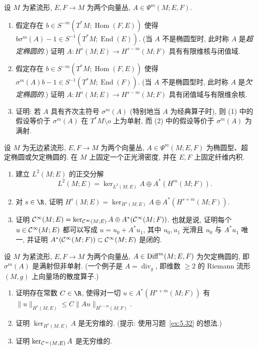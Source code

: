 \begin{exer}[超定与欠定椭圆算子: I]\label{ex:5.35}
设 $M$ 为紧流形, $E, F \to M$ 为两个向量丛, $A \in \Psi^m(M; E, F)$.
\begin{enumerate}
    \item 假定存在 $b \in S^{-m}(T^* M; \operatorname{Hom}(F, E))$ 使得 $b \sigma^m(A) - 1 \in S^{-1}(T^* M; \operatorname{End}(E))$. (当 $A$ 不是椭圆型时, 此时称 $A$ 是\emph{超定椭圆的}.) 证明 $A \colon H^s(M; E) \to H^{s-m}(M; F)$ 具有有限维核与闭值域.
    \item 假定存在 $b \in S^{-m}(T^* M; \operatorname{Hom}(F, E))$ 使得 $\sigma^m(A) b - 1 \in S^{-1}(T^* M; \operatorname{End}(F))$. (当 $A$ 不是椭圆型时, 此时称 $A$ 是\emph{欠定椭圆的}.) 证明 $A \colon H^s(M; E) \to H^{s-m}(M; F)$ 具有闭值域与有限维余核.
    \item 证明: 若 $A$ 具有齐次主符号 $\sigma^m(A)$ (特别地当 $A$ 为经典算子时), 则 (1) 中的假设等价于 $\sigma^m(A)$ 在 $T^* M \setminus o$ 上为单射, 而 (2) 中的假设等价于 $\sigma^m(A)$ 为满射.
\end{enumerate}
\end{exer}

\begin{exer}[超定与欠定椭圆算子: II]\label{ex:5.36}
设 $M$ 为无边紧流形, $E, F \to M$ 为两个向量丛, $A \in \Psi^m(M; E, F)$ 为椭圆型、超定椭圆或欠定椭圆的. 在 $M$ 上固定一个正光滑密度, 并在 $E, F$ 上固定纤维内积.
\begin{enumerate}
    \item 建立 $L^2(M; E)$ 的正交分解
    \begin{equation}\label{eq:5.233}
        L^2(M; E) = \ker_{L^2(M; E)} A \oplus A^*(H^m(M; F)).
    \end{equation}
    \item 对 $s \in \R$, 证明 $H^s(M; E) = \ker_{H^s(M; E)} A \oplus A^*(H^{s+m}(M; F))$.
    \item 证明 $\mathcal{C}^\infty(M; E) = \ker_{\mathcal{C}^\infty(M; E)} A \oplus A^*(\mathcal{C}^\infty(M; F))$. 也就是说, 证明每个 $u \in \mathcal{C}^\infty(M; E)$ 都可以写成 $u = u_0 + A^* u_1$, 其中 $u_0, u_1$ 光滑且 $u_0$ 与 $A^* u_1$ 唯一, 并证明 $A^*(\mathcal{C}^\infty(M; F)) \subset \mathcal{C}^\infty(M; E)$ 是闭的.
\end{enumerate}
\end{exer}

\begin{exer}[欠定椭圆算子]\label{ex:5.37}
设 $M$ 为紧流形, $E, F \to M$ 为两个向量丛, $A \in \operatorname{Diff}^m(M; E, F)$ 为欠定椭圆的, 即 $\sigma^m(A)$ 是满射但非单射. (一个例子是 $A = \operatorname{div}_g$, 即维数 $\ge 2$ 的 Riemann 流形 $(M, g)$ 上向量场的散度算子.)
\begin{enumerate}
    \item 证明存在常数 $C \in \R$, 使得对一切 $u \in A^*(H^{s+m}(M; F))$ 有 $\|u\|_{H^s(M; E)} \le C\|Au\|_{H^{s-m}(M; F)}$.
    \item 证明 $\ker_{H^s(M; E)} A$ 是无穷维的. (提示: 使用习题~\ref{ex:5.32} 的想法.)
    \item 证明 $\ker_{\mathcal{C}^\infty(M; E)} A$ 是无穷维的.
\end{enumerate}
\end{exer}

